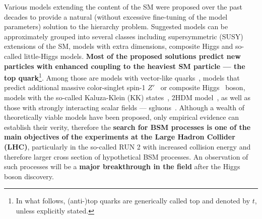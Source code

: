 \textcolor{\mycolor}{
Various models extending the content of the SM were proposed over the past decades to provide a natural (without excessive fine-tuning of the model parameters) solution to the hierarchy problem. Suggested models can be approximately grouped into several classes including supersymmetric (SUSY) extensions of the SM, models with extra dimensions, composite Higgs and so-called little-Higgs models. \textbf{Most of the proposed solutions predict new particles with enhanced coupling to the heaviest SM particle --- the top quark}\footnote{In what follows, (anti-)top quarks are generically called top and denoted by $t$, unless explicitly stated.}. Among those are models with vector-like quarks~\cite{Aguilar-Saavedra:2013qpa}, models that predict additional massive color-singlet spin-1 $Z'$~\cite{Langacker:2008yv} or composite Higgs~\cite{Agashe:2004rs} boson, models with the so-called Kaluza-Klein (KK) states~\cite{Agashe:2006hk,Davoudiasl:1999jd}, 2HDM model~\cite{Dicus:1994bm,Craig:2015jba,Craig:2016ygr}, as well as those with strongly interacting scalar fields --- sgluons~\cite{Plehn:2008ae,GoncalvesNetto:2012nt}. Although a wealth of theoretically viable models have been proposed, only empirical evidence can establish their verity, therefore the \textbf{search for BSM processes is one of the main objectives of the experiments at the Large Hadron Collider (LHC)}, particularly in the so-called RUN 2 with increased collision energy and therefore larger cross section of hypothetical BSM processes. An observation of such processes will be a \textbf{major breakthrough in the field} after the Higgs boson discovery.}

